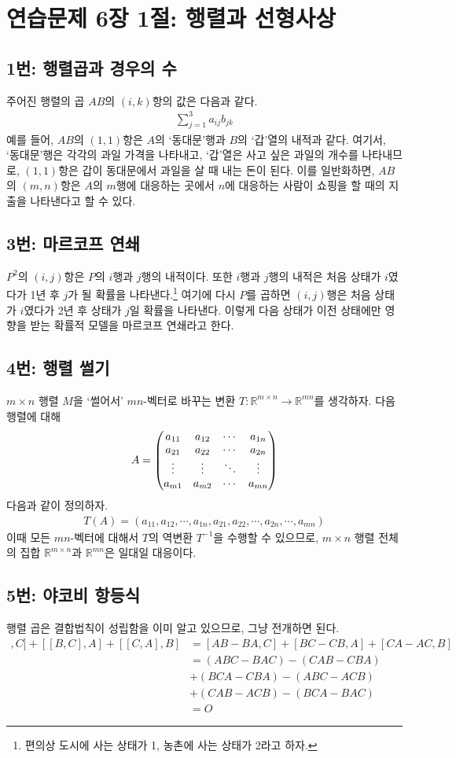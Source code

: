 \section{연습문제 6장 1절: 행렬과 선형사상}
\subsection{1번: 행렬곱과 경우의 수}
주어진 행렬의 곱 $AB$의 $(i, k)$항의 값은 다음과 같다.
\begin{align*}
\sum^3_{j=1}a_{ij}b_{jk}
\end{align*}
예를 들어, $AB$의 $(1, 1)$항은 $A$의 `동대문'행과 $B$의 `갑'열의 내적과 같다. 여기서, `동대문'행은 각각의 과일 가격을 나타내고, `갑'열은 사고 싶은 과일의 개수를 나타내므로, $(1, 1)$항은 갑이 동대문에서 과일을 살 때 내는 돈이 된다. 이를 일반화하면, $AB$의 $(m,n)$항은 $A$의 $m$행에 대응하는 곳에서 $n$에 대응하는 사람이 쇼핑을 할 때의 지출을 나타낸다고 할 수 있다.

\subsection{3번: 마르코프 연쇄}
$P^2$의 $(i, j)$항은 $P$의 $i$행과 $j$행의 내적이다. 또한 $i$행과 $j$행의 내적은 처음 상태가 $i$였다가 1년 후 $j$가 될 확률을 나타낸다.\footnote{편의상 도시에 사는 상태가 1, 농촌에 사는 상태가 2라고 하자.} 여기에 다시 $P$를 곱하면 $(i, j)$행은 처음 상태가 $i$였다가 2년 후 상태가 $j$일 확률을 나타낸다. 이렇게 다음 상태가 이전 상태에만 영향을 받는 확률적 모델을 마르코프 연쇄라고 한다.

\subsection{4번: 행렬 썰기}
$m\times n$ 행렬 $M$을 `썰어서' $mn$-벡터로 바꾸는 변환 $T: \mathbb{R}^{m\times n}\rightarrow \mathbb{R}^{mn}$를 생각하자. 다음 행렬에 대해
\begin{align*}
A=\begin{pmatrix} a_{11} & a_{12} & \cdots & a_{1n} \\ a_{21} & a_{22} & \cdots & a_{2n} \\ \vdots & \vdots & \ddots & \vdots \\ a_{m 1} & a_{m 2} & \cdots & a_{mn} \\ \end{pmatrix}
\end{align*}
다음과 같이 정의하자.
\begin{align*}
T(A)=(a_{11}, a_{12}, \cdots, a_{1n}, a_{21}, a_{22}, \cdots, a_{2n}, \cdots, a_{mn})
\end{align*}
이때 모든 $mn$-벡터에 대해서 $T$의 역변환 $T^{-1}$을 수행할 수 있으므로, $m\times n$ 행렬 전체의 집합 $\mathbb{R}^{m\times n}$과 $\mathbb{R}^{mn}$은 일대일 대응이다.

\subsection{5번: 야코비 항등식}
행렬 곱은 결합법칙이 성립함을 이미 알고 있으므로, 그냥 전개하면 된다.
\begin{align*}
[[A, B], C]+[[B, C], A]+[[C, A], B]&=[AB-BA, C]+[BC-CB, A]+[CA-AC, B]\\
&=(ABC-BAC)-(CAB-CBA)\\
&+(BCA-CBA)-(ABC-ACB)\\
&+(CAB-ACB)-(BCA-BAC)\\
&=O
\end{align*}

